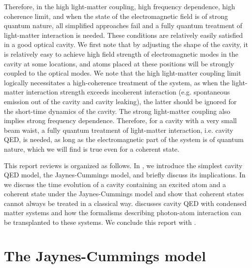 \documentclass[hyperref, a4paper]{article}
\begin{document}
Therefore, in the high light-matter coupling, high frequency dependence, high coherence limit,
and when the state of the electromagnetic field is of strong quantum nature,
all simplified approaches fail and a fully quantum treatment of light-matter interaction is needed.
These conditions are relatively easily satisfied 
in a good optical cavity.
We first note that by adjusting the shape of the cavity,
it is relatively easy to achieve high field strength of electromagnetic modes in the cavity
at some locations,
and atoms placed at these positions will be strongly coupled to the optical modes.
We note that the high light-matter coupling limit logically
necessitates a high-coherence treatment of the system,
as when the light-matter interaction strength exceeds
incoherent interaction (e.g. spontaneous emission out of the cavity and cavity leaking),
the latter should be ignored for the short-time dynamics of the cavity.
The strong light-matter coupling also implies strong frequency dependence.
Therefore, for a cavity with a very small beam waist,
a fully quantum treatment of light-matter interaction, i.e. cavity QED,
is needed, as long as the electromagnetic part of the system is of quantum nature,
which we will find is true even for a coherent state.

This report reviews is organized as follows.
In ,
we introduce the simplest cavity QED model,
the Jaynes-Cummings model,
and briefly discuss its implications.
In  
we discuss the time evolution of a cavity 
containing an excited atom and a coherent state under the Jaynes-Cummings model
and show that coherent states cannot always be treated in a classical way.
 discusses cavity QED with condensed matter systems 
and how the formalisms describing photon-atom interaction can be transplanted to these systems. 
We conclude this report with .

\section{The Jaynes-Cummings model}\label{sec:jc}
\end{document}

